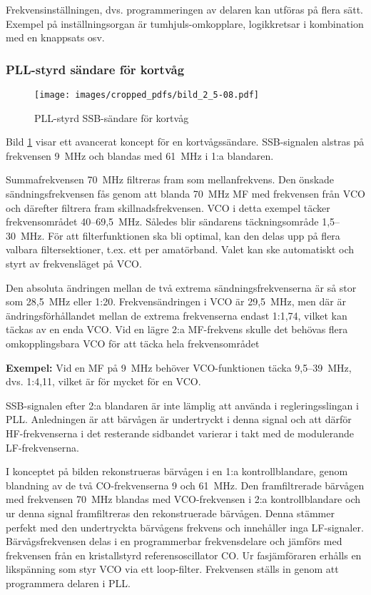 Frekvensinställningen, dvs. programmeringen av delaren kan utföras
på flera sätt. Exempel på inställningsorgan är tumhjuls-omkopplare,
logikkretsar i kombination med en knappsats osv.

\subsubsection{PLL-styrd sändare för kortvåg}

\begin{figure}
  \texttt{[image: images/cropped\_pdfs/bild\_2\_5-08.pdf]}
  \caption{PLL-styrd SSB-sändare för kortvåg}
  \label{fig:bildII5-8}
\end{figure}

Bild \ref{fig:bildII5-8} visar ett avancerat koncept för en kortvågssändare.
SSB-signalen alstras på frekvensen 9~MHz och blandas med 61~MHz i 1:a
blandaren.

Summafrekvensen 70~MHz filtreras fram som mellanfrekvens.
Den önskade sändningsfrekvensen fås genom att blanda 70~MHz MF med
frekvensen från VCO och därefter filtrera fram skillnadsfrekvensen.
VCO i detta exempel täcker frekvensområdet 40--69,5~MHz.
Således blir sändarens täckningsområde 1,5--30~MHz.
För att filterfunktionen ska bli optimal, kan den delas upp på flera
valbara filtersektioner, t.ex. ett per amatörband.
Valet kan ske automatiskt och styrt av frekvensläget på VCO.

Den absoluta ändringen mellan de två extrema sändningsfrekvenserna är
så stor som 28,5~MHz eller 1:20.
Frekvensändringen i VCO är 29,5~MHz, men där är ändringsförhållandet
mellan de extrema frekvenserna endast 1:1,74, vilket kan täckas av en enda VCO.
Vid en lägre 2:a MF-frekvens skulle det behövas flera omkopplingsbara
VCO för att täcka hela frekvensområdet

\textbf{Exempel:} Vid en MF på 9~MHz behöver VCO-funktionen täcka 9,5--39~MHz,
dvs. 1:4,11, vilket är för mycket för en VCO.

SSB-signalen efter 2:a blandaren är inte lämplig att använda i
regleringsslingan i PLL.
Anledningen är att bärvågen är undertryckt i denna signal och att därför
HF-frekvenserna i det resterande sidbandet varierar i takt med de
modulerande LF-frekvenserna.

I konceptet på bilden rekonstrueras bärvågen i en 1:a kontrollblandare,
genom blandning av de två CO-frekvenserna 9 och 61~MHz.
Den framfiltrerade bärvågen med frekvensen 70~MHz blandas med
VCO-frekvensen i 2:a kontrollblandare och ur denna signal
framfiltreras den rekonstruerade bärvågen.
Denna stämmer perfekt med den undertryckta bärvågens frekvens och
innehåller inga LF-signaler.
Bärvågsfrekvensen delas i en programmerbar frekvensdelare och jämförs
med frekvensen från en kristallstyrd referensoscillator CO.
Ur fasjämföraren erhålls en likspänning som styr VCO via ett loop-filter.
Frekvensen ställs in genom att programmera delaren i PLL.

